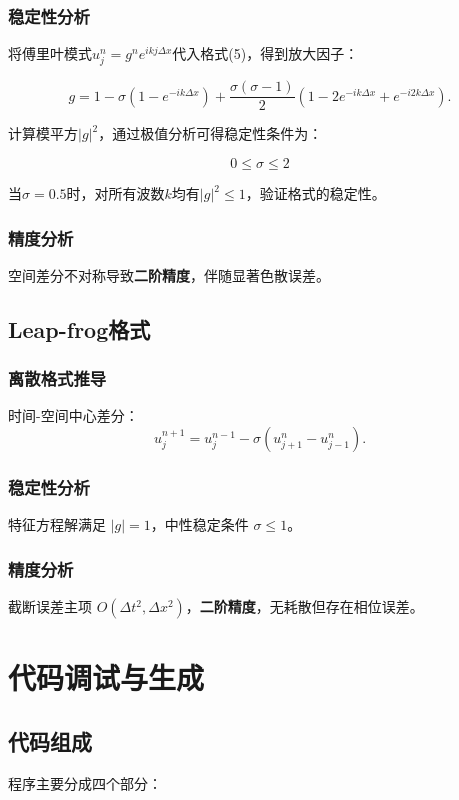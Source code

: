 \documentclass[UTF8]{ctexart}
\begin{document}
\subsubsection{稳定性分析}

将傅里叶模式$u_j^n = g^n e^{ikj\Delta x}$代入格式(5)，得到放大因子：

\begin{equation}
g=1-\sigma\left(1-e^{-i k\Delta x}\right)+\frac{\sigma(\sigma-1)}{2}\left(1-2 e^{-i k\Delta x}+e^{-i 2 k\Delta x}\right). 
\end{equation}

计算模平方$|g|^2$，通过极值分析可得稳定性条件为：

$$
0 \leq \sigma \leq 2
$$

当$\sigma=0.5$时，对所有波数$k$均有$|g|^2 \leq 1$，验证格式的稳定性。

\subsubsection{精度分析}
空间差分不对称导致\textbf{二阶精度}，伴随显著色散误差。

\subsection{Leap-frog格式}
\subsubsection{离散格式推导}
时间-空间中心差分：
\begin{equation}
u_j^{n+1} = u_j^{n-1} - \sigma(u_{j+1}^n - u_{j-1}^n).
\end{equation}

\subsubsection{稳定性分析}
特征方程解满足 $|g| = 1$，中性稳定条件 $\sigma \leq 1$。

\subsubsection{精度分析}
截断误差主项 $O(\Delta t^2, \Delta x^2)$，\textbf{二阶精度}，无耗散但存在相位误差。



\section{代码调试与生成}
\subsection{代码组成}
程序主要分成四个部分：
\end{document}
